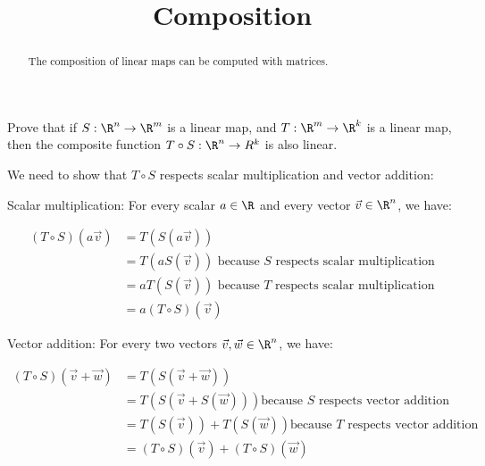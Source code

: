 \documentclass{ximera}
\title{Composition}
\begin{document}
\begin{abstract}
  The composition of linear maps can be computed with matrices.
\end{abstract}

Prove that if $S:\R^n \to \R^m$ is a linear map, and $T:\R^m \to \R^k$ is a linear map, then the composite function $T\circ S:\R^n \to R^k$ is also linear.
  
\begin{free-response}
	We need to show that $T \circ S$ respects scalar multiplication and vector addition:
	
	Scalar multiplication:
	For every scalar $a \in \R$ and every vector $\vec{v} \in \R^n$, we have:
	
	\begin{align*}	
		(T\circ S)(a\vec{v}) &= T\left(S(a\vec{v})\right)\\
		&= T(aS(\vec{v})) \text{ because $S$ respects scalar multiplication}\\
		&= aT(S(\vec{v})) \text{ because $T$ respects scalar multiplication}\\
		&=a(T \circ S)(\vec{v})
	\end{align*}
	
	Vector addition:
	For every two vectors $\vec{v},\vec{w} \in \R^n$, we have:
		
		\begin{align*}
			(T \circ S)(\vec{v}+\vec{w}) &= T\left(S(\vec{v}+\vec{w})\right) \\
			&= T(S(\vec{v}+S(\vec{w}))) \text{because $S$ respects vector addition}\\
			&= T(S(\vec{v}))+T(S(\vec{w})) \text{because $T$ respects vector addition}\\
			&= (T \circ S)(\vec{v})+(T\circ S)(\vec{w})
		\end{align*}
\end{free-response}
	
\end{document}
